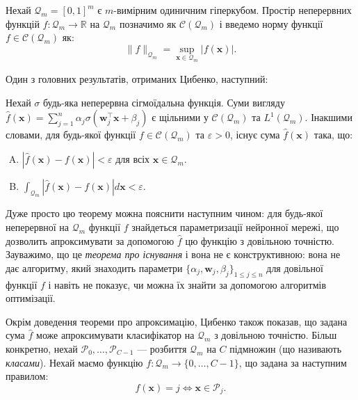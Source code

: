 Нехай $\mathcal{Q}_m = [0,1]^m$ є $m$-вимірним одиничним гіперкубом. Простір
неперервних функцій $f: \mathcal{Q}_m \to \mathbb{R}$ на $\mathcal{Q}_m$
позначимо як $\mathcal{C}(\mathcal{Q}_m)$ і введемо норму функції $f \in
\mathcal{C}(\mathcal{Q}_m)$ як:
\begin{equation*}
    \|f\|_{\mathcal{Q}_m} = \sup_{\mathbf{x} \in \mathcal{Q}_m} |f(\mathbf{x})|.
\end{equation*}

Один з головних результатів, отриманих Цибенко, наступний:
\begin{theorem}\label{theorem:cybenko_1}
    Нехай $\sigma$ будь-яка неперервна сігмоїдальна функція. Суми вигляду
    $\widehat{f}(\mathbf{x}) = \sum_{j=1}^n
    \alpha_j\sigma(\boldsymbol{w}_j^{\top}\mathbf{x} + \beta_j)$ є щільними у
    $\mathcal{C}(\mathcal{Q}_m)$ та $L^1(\mathcal{Q}_m)$. Інакшими словами, для
    будь-якої функції $f \in \mathcal{C}(\mathcal{Q}_m)$ та $\varepsilon > 0$,
    існує сума $\widehat{f}(\mathbf{x})$ така, що:
    \begin{enumerate}[(A)]
        \item $|\widehat{f}(\mathbf{x})-f(\mathbf{x})|<\varepsilon$ для всіх $\mathbf{x} \in
        \mathcal{Q}_m$.
        \item $\int_{\mathcal{Q}_m}|\widehat{f}(\mathbf{x})-f(\mathbf{x})|d\mathbf{x} <
        \varepsilon$.
    \end{enumerate}
\end{theorem}

Дуже просто цю теорему можна пояснити наступним чином: для будь-якої неперервної
на $\mathcal{Q}_m$ функції $f$ знайдеться параметризації нейронної мережі, що
дозволить апроксимувати за допомогою $\widehat{f}$ цю функцію з довільною точністю.
Зауважимо, що це \textit{теорема про існування} і вона не є конструктивною: вона
не дає алгоритму, який знаходить параметри
$\{\alpha_j,\boldsymbol{w}_j,\beta_j\}_{1 \leq j \leq n}$ для довільної функції
$f$ і навіть не показує, чи можна їх знайти за допомогою алгоритмів оптимізації.

Окрім доведення теореми про апроксимацію, Цибенко також показав, що задана сума
$\widehat{f}$ може апроксимувати класифікатор на $\mathcal{Q}_m$ з довільною
точністю. Більш конкретно, нехай $\mathcal{P}_0,\dots,\mathcal{P}_{C-1}$ ---
розбиття $\mathcal{Q}_m$ на $C$ підмножин (що називають \textit{класами}). Нехай
маємо функцію $f: \mathcal{Q}_m \to \{0,\dots,C-1\}$, що задана за наступним
правилом:
\begin{equation*}
    f(\mathbf{x}) = j \iff \mathbf{x} \in \mathcal{P}_j.
\end{equation*}

